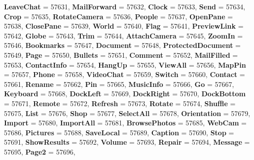 \begin{DoxyCompactItemize}
{\bfseries Leave\+Chat} = 57631, 
\newline
{\bfseries Mail\+Forward} = 57632, 
{\bfseries Clock} = 57633, 
{\bfseries Send} = 57634, 
{\bfseries Crop} = 57635, 
\newline
{\bfseries Rotate\+Camera} = 57636, 
{\bfseries People} = 57637, 
{\bfseries Open\+Pane} = 57638, 
{\bfseries Close\+Pane} = 57639, 
\newline
{\bfseries World} = 57640, 
{\bfseries Flag} = 57641, 
{\bfseries Preview\+Link} = 57642, 
{\bfseries Globe} = 57643, 
\newline
{\bfseries Trim} = 57644, 
{\bfseries Attach\+Camera} = 57645, 
{\bfseries Zoom\+In} = 57646, 
{\bfseries Bookmarks} = 57647, 
\newline
{\bfseries Document} = 57648, 
{\bfseries Protected\+Document} = 57649, 
{\bfseries Page} = 57650, 
{\bfseries Bullets} = 57651, 
\newline
{\bfseries Comment} = 57652, 
{\bfseries Mail\+Filled} = 57653, 
{\bfseries Contact\+Info} = 57654, 
{\bfseries Hang\+Up} = 57655, 
\newline
{\bfseries View\+All} = 57656, 
{\bfseries Map\+Pin} = 57657, 
{\bfseries Phone} = 57658, 
{\bfseries Video\+Chat} = 57659, 
\newline
{\bfseries Switch} = 57660, 
{\bfseries Contact} = 57661, 
{\bfseries Rename} = 57662, 
{\bfseries Pin} = 57665, 
\newline
{\bfseries Music\+Info} = 57666, 
{\bfseries Go} = 57667, 
{\bfseries Keyboard} = 57668, 
{\bfseries Dock\+Left} = 57669, 
\newline
{\bfseries Dock\+Right} = 57670, 
{\bfseries Dock\+Bottom} = 57671, 
{\bfseries Remote} = 57672, 
{\bfseries Refresh} = 57673, 
\newline
{\bfseries Rotate} = 57674, 
{\bfseries Shuffle} = 57675, 
{\bfseries List} = 57676, 
{\bfseries Shop} = 57677, 
\newline
{\bfseries Select\+All} = 57678, 
{\bfseries Orientation} = 57679, 
{\bfseries Import} = 57680, 
{\bfseries Import\+All} = 57681, 
\newline
{\bfseries Browse\+Photos} = 57685, 
{\bfseries Web\+Cam} = 57686, 
{\bfseries Pictures} = 57688, 
{\bfseries Save\+Local} = 57689, 
\newline
{\bfseries Caption} = 57690, 
{\bfseries Stop} = 57691, 
{\bfseries Show\+Results} = 57692, 
{\bfseries Volume} = 57693, 
\newline
{\bfseries Repair} = 57694, 
{\bfseries Message} = 57695, 
{\bfseries Page2} = 57696, 

\end{DoxyCompactItemize}

